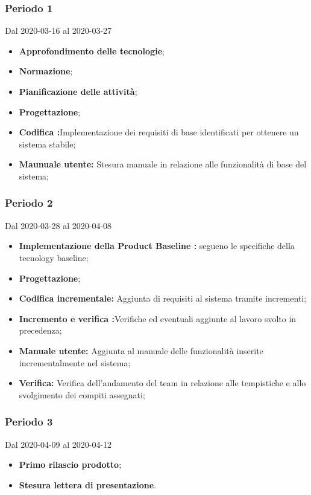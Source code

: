 \subsubsection{Periodo 1} 
Dal 2020-03-16 al 2020-03-27\\
\begin{itemize}
	\item \textbf{Approfondimento delle tecnologie};
	\item \textbf{Normazione};
	\item \textbf{Pianificazione delle attività};
	\item \textbf{Progettazione};
	\item \textbf{Codifica :}Implementazione dei requisiti di base identificati per ottenere un sistema stabile;
	\item \textbf{Maunuale utente: }Stesura manuale in relazione alle funzionalità di base del sistema;
\end{itemize}
\subsubsection{Periodo 2} 
Dal 2020-03-28 al 2020-04-08\\
\begin{itemize}
	\item \textbf{Implementazione della Product Baseline :} segueno le specifiche della tecnology baseline;
	\item \textbf{Progettazione};
	\item \textbf{Codifica incrementale: }Aggiunta di requisiti al sistema tramite incrementi;
	\item \textbf{Incremento e verifica :}Verifiche ed eventuali aggiunte al lavoro svolto in precedenza;
	\item \textbf{Manuale utente: }Aggiunta al manuale delle funzionalità inserite incrementalmente nel sistema;
	\item \textbf{Verifica: }Verifica dell'andamento del team in relazione alle tempistiche e allo svolgimento dei compiti assegnati;
\end{itemize}
\subsubsection{Periodo 3}
Dal 2020-04-09 al 2020-04-12\\
\begin{itemize}
	\item \textbf{Primo rilascio prodotto};
	\item \textbf{Stesura lettera di presentazione}.
\end{itemize}
